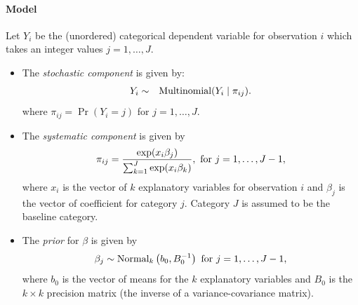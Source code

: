 \documentclass[letterpaper,10pt,english]{sphinxmanual}
\begin{document}
\paragraph{Model}
\label{zelig-mlogitbayes:model}
Let \(Y_{i}\) be the (unordered) categorical dependent variable for
observation \(i\) which takes an integer values
\(j=1, \ldots, J\).
\begin{itemize}
\item {} 
The \emph{stochastic component} is given by:
\begin{gather}
\begin{split}\begin{aligned}
Y_{i} &\sim& \textrm{Multinomial}(Y_i \mid \pi_{ij}).\end{aligned}\end{split}\notag
\end{gather}
where \(\pi_{ij}=\Pr(Y_i=j)\) for \(j=1, \ldots, J\).

\item {} 
The \emph{systematic component} is given by
\begin{gather}
\begin{split}\begin{aligned}
\pi_{ij}=\frac{\exp(x_i\beta_j)}{\sum_{k=1}^J \exp(x_i\beta_k)},
\textrm{ for } j=1,\ldots, J-1,\end{aligned}\end{split}\notag
\end{gather}
where \(x_{i}\) is the vector of \(k\) explanatory variables
for observation \(i\) and \(\beta_j\) is the vector of
coefficient for category \(j\). Category \(J\) is assumed to
be the baseline category.

\item {} 
The \emph{prior} for \(\beta\) is given by
\begin{gather}
\begin{split}\begin{aligned}
\beta_j \sim \textrm{Normal}_k\left(  b_{0},B_{0}^{-1}\right)
\textrm{ for } j = 1, \ldots, J-1,\end{aligned}\end{split}\notag
\end{gather}
where \(b_{0}\) is the vector of means for the \(k\)
explanatory variables and \(B_{0}\) is the \(k \times k\)
precision matrix (the inverse of a variance-covariance matrix).

\end{itemize}
\end{document}
